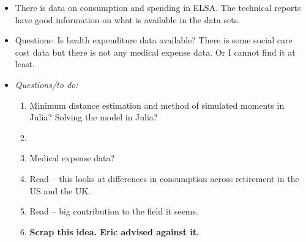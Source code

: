 \documentclass[12pt]{article}
\begin{document}
\begin{itemize}
      \item There is data on consumption and spending in ELSA. The technical reports have good information on what is available
            in the data sets.

      \item Questions: Is health expenditure data available? There is some social care cost data but there is not any medical expense data.
            Or I cannot find it at least.

      \item \textit{Questions/to do:}
            \begin{enumerate}
                  \item Minimum distance estimation and method of simulated moments in Julia? Solving the model in Julia?
                  \item
                  \item Medical expense data?
                  \item Read \cite{banks_et_al_aej_2019} -- this looks at differences in consumption across retirement in the US and the UK.
                  \item Read \cite{gourinchas_parker_ec_2003} -- big contribution to the field it seems.
                  \item \textbf{Scrap this idea. Eric advised against it.}
            \end{enumerate}


\end{itemize}
\end{document}
